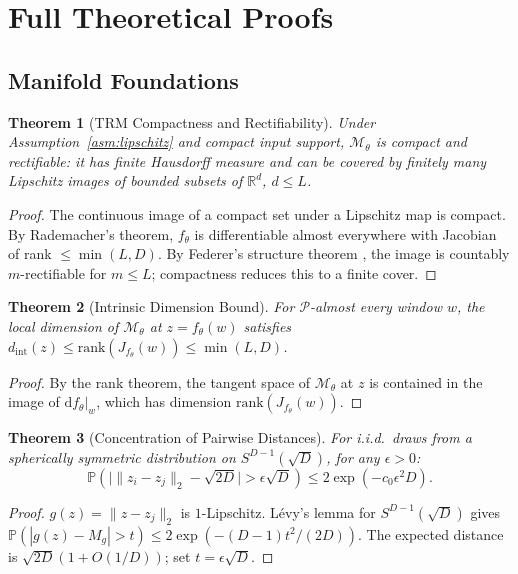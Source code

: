 \documentclass[10pt]{article}
\newtheorem{theorem}{Theorem}[section]
\theoremstyle{definition}
\theoremstyle{remark}
\newcommand{\R}{\mathbb{R}}
\newcommand{\Prob}{\mathbb{P}}
\newcommand{\trm}{\mathcal{M}_\theta}
\newcommand{\norm}[1]{\lVert #1 \rVert}
\newcommand{\abs}[1]{\lvert #1 \rvert}
\newcommand{\dint}{\ensuremath{d_{\mathrm{int}}}}
\begin{document}
\section{Full Theoretical Proofs}
\label{app:proofs}

\subsection{Manifold Foundations}
\label{app:manifold_proofs}

\begin{theorem}[TRM Compactness and Rectifiability]
\label{thm:trm_rect_app}
Under Assumption~\ref{asm:lipschitz} and compact input support, $\trm$ is
compact and rectifiable: it has finite Hausdorff measure and can be covered
by finitely many Lipschitz images of bounded subsets of $\R^d$, $d \leq L$.
\end{theorem}
\begin{proof}
The continuous image of a compact set under a Lipschitz map is compact.
By Rademacher's theorem, $f_\theta$ is differentiable almost everywhere with
Jacobian of rank $\leq \min(L,D)$.
By Federer's structure theorem \citep{federer1969geometric}, the image is
countably $m$-rectifiable for $m \leq L$; compactness reduces this to a
finite cover.
\end{proof}

\begin{theorem}[Intrinsic Dimension Bound]
\label{thm:id_bound_app}
For $\mathcal{P}$-almost every window $w$, the local dimension of $\trm$
at $z = f_\theta(w)$ satisfies
$\dint(z) \leq \mathrm{rank}(J_{f_\theta}(w)) \leq \min(L,D)$.
\end{theorem}
\begin{proof}
By the rank theorem, the tangent space of $\trm$ at $z$ is contained in the
image of $\mathrm{d}f_\theta|_w$, which has dimension $\mathrm{rank}(J_{f_\theta}(w))$.
\end{proof}

\begin{theorem}[Concentration of Pairwise Distances]
\label{thm:concentration_app}
For i.i.d.\ draws from a spherically symmetric distribution on
$S^{D-1}(\sqrt{D})$, for any $\epsilon > 0$:
\[
  \Prob\!\left(\abs{\norm{z_i - z_j}_2 - \sqrt{2D}} > \epsilon\sqrt{D}\right)
  \leq 2\exp(-c_0\epsilon^2 D).
\]
\end{theorem}
\begin{proof}
$g(z) = \norm{z - z_j}_2$ is $1$-Lipschitz. L\'{e}vy's lemma for
$S^{D-1}(\sqrt{D})$ \citep{ledoux2001concentration} gives
$\Prob(|g(z) - M_g| > t) \leq 2\exp(-{(D-1)t^2}/{(2D)})$.
The expected distance is $\sqrt{2D}(1+O(1/D))$; set $t = \epsilon\sqrt{D}$.
\end{proof}
\end{document}
